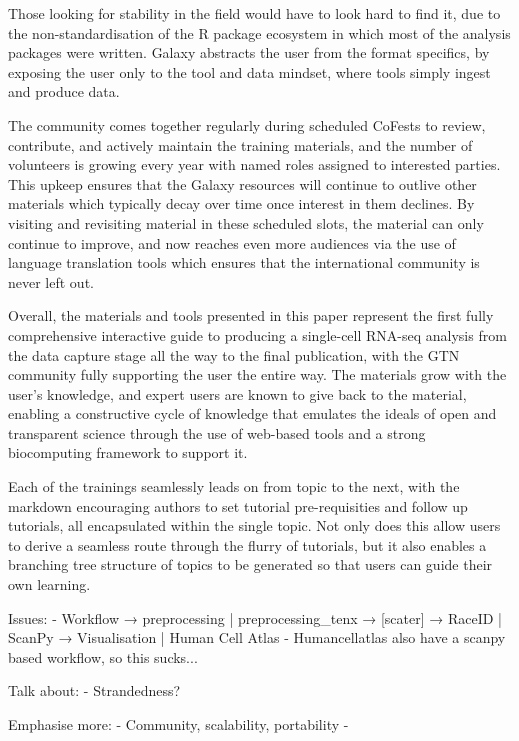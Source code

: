 \documentclass[a4paper,num-refs]{oup-contemporary}
\begin{document}
Those looking for stability in the field would have to look hard to find it, due to the non-standardisation of the R package ecosystem in which most of the analysis packages were written. Galaxy abstracts the user from the format specifics, by exposing the user only to the tool and data mindset, where tools simply ingest and produce data.

The community comes together regularly during scheduled CoFests to review, contribute, and actively maintain the training materials, and the number of volunteers is growing every year with named roles assigned to interested parties. This upkeep ensures that the Galaxy resources will continue to outlive other materials which typically decay over time once interest in them declines. By visiting and revisiting material in these scheduled slots, the material can only continue to improve, and now reaches even more audiences via the use of language translation tools which ensures that the international community is never left out.

Overall, the materials and tools presented in this paper represent the first fully comprehensive interactive guide to producing a single-cell RNA-seq analysis from the data capture stage all the way to the final publication, with the GTN community fully supporting the user the entire way. The materials grow with the user's knowledge, and expert users are known to give back to the material, enabling a constructive cycle of knowledge that emulates the ideals of open and transparent science through the use of web-based tools and a strong biocomputing framework to support it.

Each of the trainings seamlessly leads on from topic to the next, with the markdown encouraging authors to set tutorial pre-requisities and follow up tutorials, all encapsulated within the single topic. Not only does this allow users to derive a seamless route through the flurry of tutorials, but it also enables a branching tree structure of topics to be generated so that users can guide their own learning. 







Issues:
- Workflow → { preprocessing | preprocessing_tenx } → [scater] → { RaceID | ScanPy } → { Visualisation | Human Cell Atlas }
- Humancellatlas also have a scanpy based workflow, so this sucks...

Talk about:
- Strandedness?


Emphasise more:
- Community, scalability, portability
- 
\end{document}
